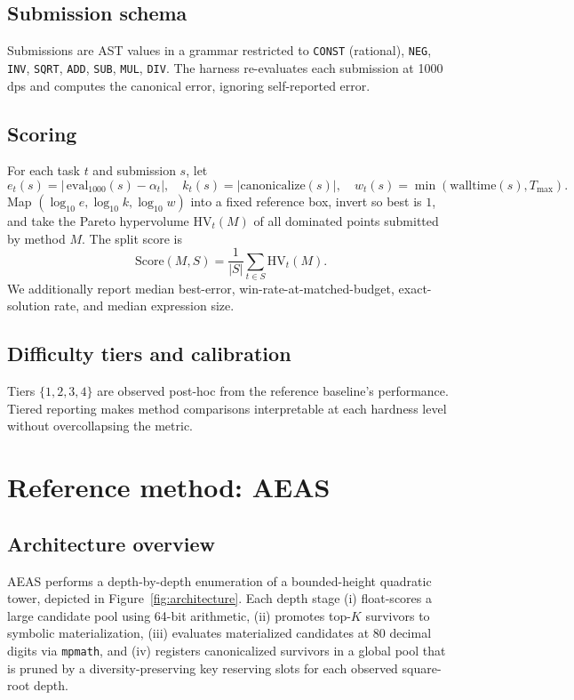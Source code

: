 \documentclass[11pt]{article}
\begin{document}
\subsection{Submission schema}

Submissions are AST values in a grammar restricted to \texttt{CONST} (rational), \texttt{NEG}, \texttt{INV}, \texttt{SQRT}, \texttt{ADD}, \texttt{SUB}, \texttt{MUL}, \texttt{DIV}. The harness re-evaluates each submission at 1000 dps and computes the canonical error, ignoring self-reported error.

\subsection{Scoring}

For each task $t$ and submission $s$, let
\[
  e_t(s) = \bigl|\,\mathrm{eval}_{1000}(s) - \alpha_t\bigr|,\quad
  k_t(s) = |\mathrm{canonicalize}(s)|,\quad
  w_t(s) = \min(\mathrm{walltime}(s), T_{\max}).
\]
Map $(\log_{10} e, \log_{10} k, \log_{10} w)$ into a fixed reference box, invert so best is $1$, and take the Pareto hypervolume $\mathrm{HV}_t(M)$ of all dominated points submitted by method $M$. The split score is
\[
  \mathrm{Score}(M, S) = \frac{1}{|S|} \sum_{t \in S} \mathrm{HV}_t(M).
\]
We additionally report median best-error, win-rate-at-matched-budget, exact-solution rate, and median expression size.

\subsection{Difficulty tiers and calibration}

Tiers $\{1, 2, 3, 4\}$ are observed post-hoc from the reference baseline's performance. Tiered reporting makes method comparisons interpretable at each hardness level without overcollapsing the metric.

\section{Reference method: AEAS}
\label{sec:method}

\subsection{Architecture overview}

AEAS performs a depth-by-depth enumeration of a bounded-height quadratic tower, depicted in Figure~\ref{fig:architecture}. Each depth stage (i) float-scores a large candidate pool using 64-bit arithmetic, (ii) promotes top-$K$ survivors to symbolic materialization, (iii) evaluates materialized candidates at 80 decimal digits via \texttt{mpmath}, and (iv) registers canonicalized survivors in a global pool that is pruned by a diversity-preserving key reserving slots for each observed square-root depth.
\end{document}
